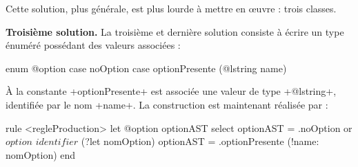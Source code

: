 Cette solution, plus générale, est plus lourde à mettre en œuvre : trois classes.

\textbf{Troisième solution.} La troisième et dernière solution consiste à écrire un type énuméré possédant des valeurs associées :

\begin{galgas4}
enum @option {
  case noOption
  case optionPresente (@lstring name)
}
\end{galgas4}

À la constante \ggst+optionPresente+ est associée une valeur de type \ggst+@lstring+, identifiée par le nom \ggst+name+. La construction est maintenant réalisée par :
\begin{galgas4}
rule <regleProduction> {
  let @option optionAST
  select
    optionAST = .noOption
  or
    $option$
    $identifier$ (?let nomOption)
    optionAST = .optionPresente (!name: nomOption)
  end
}
\end{galgas4}












